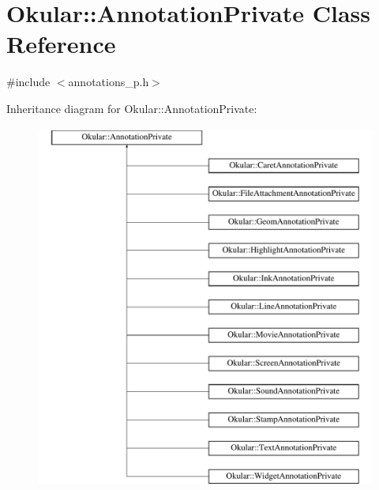 \hypertarget{classOkular_1_1AnnotationPrivate}{\section{Okular\+:\+:Annotation\+Private Class Reference}
\label{classOkular_1_1AnnotationPrivate}
}


{\ttfamily \#include $<$annotations\+\_\+p.\+h$>$}

Inheritance diagram for Okular\+:\+:Annotation\+Private\+:\begin{figure}[H]
\begin{center}
\leavevmode
\includegraphics[height=12.000000cm]{classOkular_1_1AnnotationPrivate}
\end{center}
\end{figure}
